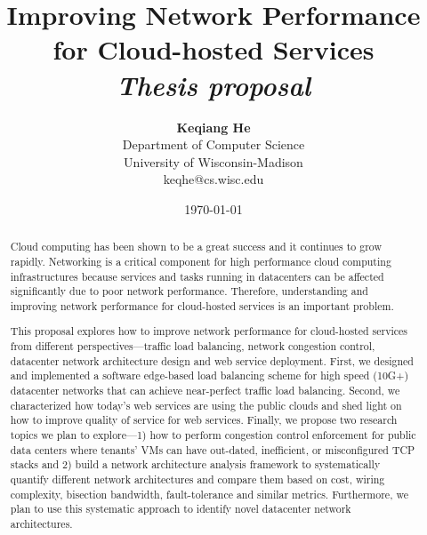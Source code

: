 \documentclass[12pt]{article}
\title{{\bf Improving Network Performance for Cloud-hosted Services} \\
\it Thesis proposal}
\author{ {\bf Keqiang He}  \\
Department of Computer Science \\
University of Wisconsin-Madison\\
{\small keqhe@cs.wisc.edu}
}
\date{\today}
\begin{document}
\pagestyle{plain}
\maketitle

\pagebreak
\begin{abstract}

Cloud computing has been shown to be a great success and it continues 
to grow rapidly. Networking is a critical component for high performance cloud 
computing infrastructures because services and 
tasks running in datacenters can be affected significantly due to poor network performance. 
Therefore, understanding and 
improving network performance for cloud-hosted services is an important problem.

This proposal explores how to improve network performance for cloud-hosted services 
from different perspectives---traffic load balancing, network congestion control, 
datacenter network architecture design and web service deployment. 
First, 
we designed and implemented a software edge-based load balancing scheme for 
high speed (10G+) datacenter networks that can achieve near-perfect traffic load balancing. 
Second, we characterized how today's web services are using the public clouds and 
shed light on how to improve quality of service for web services.
Finally, we propose two research topics we plan to explore---1) how to perform congestion control 
enforcement for public data centers where tenants' VMs can have out-dated, inefficient, or
misconfigured TCP stacks 
and 2) build a network architecture analysis framework
to systematically quantify different network architectures and compare them based on
cost, wiring complexity, bisection bandwidth, fault-tolerance and similar metrics. 
Furthermore, we plan to use this systematic approach to identify 
novel datacenter network architectures.

\end{abstract}

\pagebreak
\tableofcontents
\pagebreak

\cleardoublepage
{}




%



\pagebreak

\begin{footnotesize}


\end{footnotesize}
\end{document}
